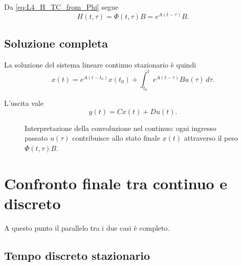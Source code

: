 Da \eqref{eq:L4_H_TC_from_Phi} segue
\[
H(t,\tau)=\Phi(t,\tau)B=e^{A(t-\tau)}B.
\]

\subsection{Soluzione completa}

La soluzione del sistema lineare continuo stazionario è quindi
\begin{equation}
x(t)=e^{A(t-t_0)}x(t_0)+\int_{t_0}^{t}e^{A(t-\tau)}Bu(\tau)\,d\tau.
\label{eq:L4_sol_TC_LTI}
\end{equation}

L'uscita vale
\begin{equation}
y(t)=Cx(t)+Du(t).
\label{eq:L4_out_TC_LTI}
\end{equation}

\begin{figure}[H]
\centering
{}
\caption{Interpretazione della convoluzione nel continuo: ogni ingresso passato $u(\tau)$ contribuisce allo stato finale $x(t)$ attraverso il peso $\Phi(t,\tau)B$.}
\end{figure}

\section{Confronto finale tra continuo e discreto}

A questo punto il parallelo tra i due casi è completo.

\subsection{Tempo discreto stazionario}

